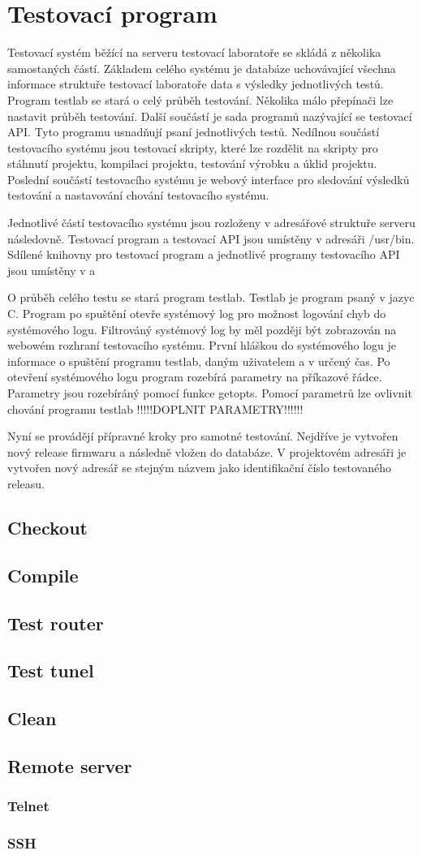\chapter{Testovací program}
Testovací systém běžící na serveru testovací laboratoře se skládá z několika samostaných částí. Základem celého systému je databáze uchovávající všechna informace struktuře testovací laboratoře data s výsledky jednotlivých testů. Program testlab se stará o celý průběh testování. Několika málo přepínači lze nastavit průběh testování. Další součástí je sada programů nazývající se testovací API. Tyto programu usnadňují psaní jednotlivých testů. Nedílnou součástí testovacího systému jsou testovací skripty, které lze rozdělit na skripty pro stáhnutí projektu, kompilaci projektu, testování výrobku a úklid projektu. Poslední součástí testovacího systému je webový interface pro sledování výsledků testování a nastavování chování testovacího systému.

Jednotlivé částí testovacího systému jsou rozloženy v adresářové struktuře serveru následovně. Testovací program a testovací API jsou umístěny v adresáři /usr/bin. Sdílené knihovny pro testovací program a jednotlivé programy testovacího API jsou umístěny v a

O průběh celého testu se stará program testlab. Testlab je program psaný v jazyc C. Program po spuštění otevře systémový log pro možnost logování chyb do systémového logu. Filtrováný systémový log by měl později být zobrazován na webowém rozhraní testovacího systému. První hláškou do systémového logu je informace o spuštění programu testlab, daným uživatelem a v určený čas. Po otevření systémového logu program rozebírá parametry na příkazové řádce. Parametry jsou rozebíráný pomocí funkce getopts. Pomocí parametrů lze ovlivnit chování programu testlab !!!!!DOPLNIT PARAMETRY!!!!!!

Nyní se provádějí přípravné kroky pro samotné testování. Nejdříve je vytvořen nový release firmwaru a následně vložen do databáze. V projektovém adresáři je vytvořen nový adresář se stejným názvem jako identifikační číslo testovaného releasu.

\section{Checkout}
\section{Compile}
\section{Test router}
\section{Test tunel}
\section{Clean}
\section{Remote server}
\subsection{Telnet}
\subsection{SSH}

\endinput
